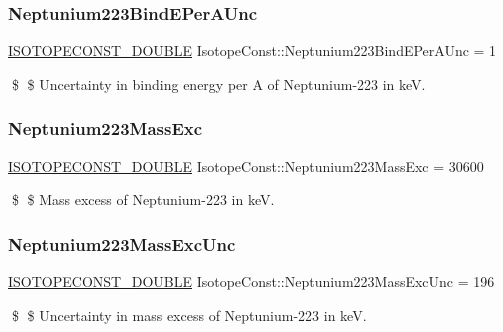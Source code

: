 \subsubsection{\texorpdfstring{Neptunium223\+Bind\+E\+Per\+A\+Unc}{Neptunium223BindEPerAUnc}}
{\footnotesize\ttfamily \mbox{\hyperlink{group___isotope_const-_macros_ga8f45a7272ce02c0b4c65c44636ed719a}{I\+S\+O\+T\+O\+P\+E\+C\+O\+N\+S\+T\+\_\+\+D\+O\+U\+B\+LE}} Isotope\+Const\+::\+Neptunium223\+Bind\+E\+Per\+A\+Unc = 1}

\$ \$ Uncertainty in binding energy per A of Neptunium-\/223 in keV. \mbox{\label{group___isotope_const-_neptunium-_np223_gad647baa1b4eff244910b34f4153a9ef0}} 
\subsubsection{\texorpdfstring{Neptunium223\+Mass\+Exc}{Neptunium223MassExc}}
{\footnotesize\ttfamily \mbox{\hyperlink{group___isotope_const-_macros_ga8f45a7272ce02c0b4c65c44636ed719a}{I\+S\+O\+T\+O\+P\+E\+C\+O\+N\+S\+T\+\_\+\+D\+O\+U\+B\+LE}} Isotope\+Const\+::\+Neptunium223\+Mass\+Exc = 30600}

\$ \$ Mass excess of Neptunium-\/223 in keV. \mbox{\label{group___isotope_const-_neptunium-_np223_gaf3b81d5e341c9aa6d82a6b35df4363c7}} 
\subsubsection{\texorpdfstring{Neptunium223\+Mass\+Exc\+Unc}{Neptunium223MassExcUnc}}
{\footnotesize\ttfamily \mbox{\hyperlink{group___isotope_const-_macros_ga8f45a7272ce02c0b4c65c44636ed719a}{I\+S\+O\+T\+O\+P\+E\+C\+O\+N\+S\+T\+\_\+\+D\+O\+U\+B\+LE}} Isotope\+Const\+::\+Neptunium223\+Mass\+Exc\+Unc = 196}

\$ \$ Uncertainty in mass excess of Neptunium-\/223 in keV. \mbox{\label{group___isotope_const-_neptunium-_np223_ga1f696bdae6c9f8c1870ea32e0159a667}} 
